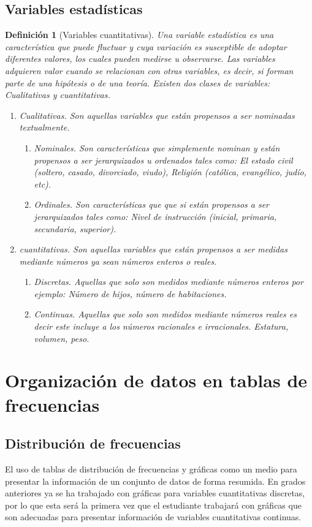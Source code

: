 \documentclass[a4paper]{report}
\newtheorem{defn}[thm]{Definición}
\begin{document}
\subsection{Variables estadísticas}

\begin{defn}[Variables cuantitativas]
Una variable estadística es una característica que puede fluctuar y cuya variación es susceptible de adoptar diferentes valores, los cuales pueden medirse u observarse. Las variables adquieren valor cuando se relacionan con otras variables, es decir, si forman parte de una hipótesis o de una teoría. Existen dos clases de variables: Cualitativas y cuantitativas.
  \begin{enumerate}
    \item  Cualitativas. Son aquellas variables que están propensos a ser nominadas textualmente.
    \begin{enumerate}
      \item  Nominales. Son características que simplemente nominan y están propensos a ser jerarquizados u ordenados tales como: El estado   civil (soltero, casado, divorciado, viudo), Religión (católica, evangélico, judío, etc).
      \item  Ordinales. Son características que que si están propensos a ser jerarquizados tales como: Nivel de instrucción (inicial, primaria, secundaria, superior).
    \end{enumerate}
    \item  cuantitativas. Son aquellas variables que están propensos a ser medidas mediante números ya sean números enteros o reales.
    \begin{enumerate}
      \item  Discretas. Aquellas que solo son medidos mediante números enteros por ejemplo: Número de hijos, número de habitaciones.
      \item  Continuas. Aquellas que solo son medidos mediante números reales es decir este incluye a los números racionales e irracionales. Estatura, volumen, peso.
    \end{enumerate}
  \end{enumerate}
\end{defn}


\section{Organización de datos en tablas de frecuencias}
\subsection{Distribución de frecuencias}
El uso de tablas de distribución de frecuencias y gráficas como un medio para presentar la información
de un conjunto de datos de forma resumida. En grados anteriores ya se ha trabajado con gráficas para
variables cuantitativas discretas, por lo que esta será la primera vez que el estudiante trabajará con
gráficas que son adecuadas para presentar información de variables cuantitativas continuas.
\end{document}
